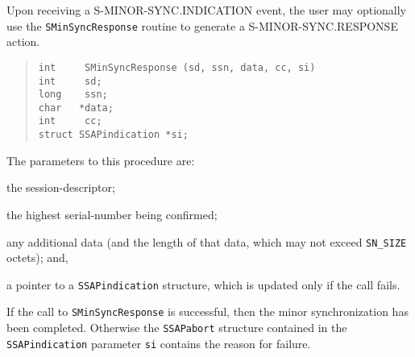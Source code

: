 Upon receiving a {\sf S-MINOR-SYNC.INDICATION\/} event,
the user may optionally use the \verb"SMinSyncResponse" routine
to generate a {\sf S-MINOR-SYNC.RESPONSE\/} action.
\begin{quote}\small\begin{verbatim}
int     SMinSyncResponse (sd, ssn, data, cc, si)
int     sd;
long    ssn;
char   *data;
int     cc;
struct SSAPindication *si;
\end{verbatim}\end{quote}
The parameters to this procedure are:
\begin{describe}
\item[\verb"sd":] the session-descriptor;

\item[\verb"ssn":] the highest serial-number being confirmed;

\item[\verb"data"/\verb"cc":] any additional data
(and the length of that data, which may not exceed \verb"SN_SIZE" octets);
and,

\item[\verb"si":] a pointer to a \verb"SSAPindication" structure, which is
updated only if the call fails.
\end{describe}
If the call to \verb"SMinSyncResponse" is successful,
then the minor synchronization has been completed.
Otherwise the \verb"SSAPabort" structure contained in
the \verb"SSAPindication" parameter
\verb"si" contains the reason for failure.

